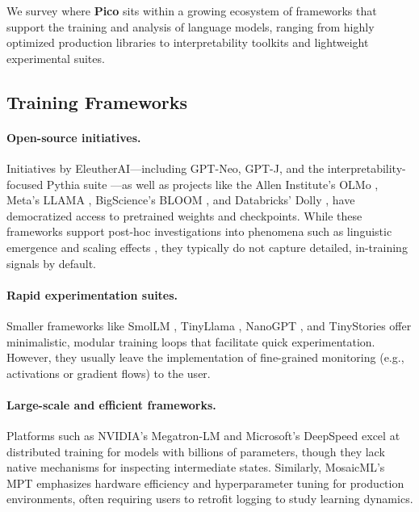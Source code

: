 We survey where \textbf{Pico} sits within a growing ecosystem of frameworks that support the training and analysis of language models, ranging from highly optimized production libraries to interpretability toolkits and lightweight experimental suites. 

\subsection{Training Frameworks}

\paragraph{Open-source initiatives.} Initiatives by EleutherAI—including GPT-Neo, GPT-J, and the interpretability-focused Pythia suite \cite{biderman2023pythia}—as well as projects like the Allen Institute's OLMo \citep{groeneveld2024olmo}, Meta’s LLAMA \cite{touvron2023llama}, BigScience’s BLOOM \cite{le2023bloom}, and Databricks’ Dolly \cite{databricksdolly2023}, have democratized access to pretrained weights and checkpoints. While these frameworks support post-hoc investigations into phenomena such as linguistic emergence and scaling effects \cite{belrose2023eliciting, gurnee2023finding, michaelov2023emergent, diehlmartinez2024tending}, they typically do not capture detailed, in-training signals by default.

\paragraph{Rapid experimentation suites.} Smaller frameworks like SmolLM \citep{allal2025smollm2}, TinyLlama \citep{zhang2024tinyllama}, NanoGPT \cite{karpathy2023nanogpt},  and TinyStories \cite{eldan2023tinystoriessmalllanguagemodels} offer minimalistic, modular training loops that facilitate quick experimentation. However, they usually leave the implementation of fine-grained monitoring (e.g., activations or gradient flows) to the user.

\paragraph{Large-scale and efficient frameworks.} Platforms such as NVIDIA’s Megatron-LM \cite{narayanan2021megatron} and Microsoft’s DeepSpeed \cite{rasley2020deepspeed} excel at distributed training for models with billions of parameters, though they lack native mechanisms for inspecting intermediate states. Similarly, MosaicML’s MPT \cite{mosaic2023mpt} emphasizes hardware efficiency and hyperparameter tuning for production environments, often requiring users to retrofit logging to study learning dynamics.

